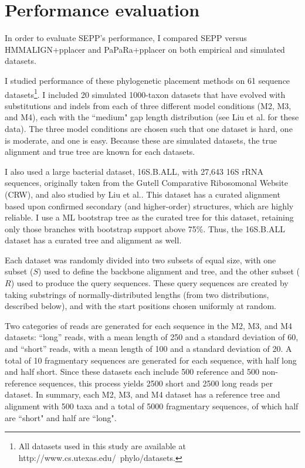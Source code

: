 \section{Performance evaluation}\label{sepp:evaluation}

In order to evaluate SEPP's performance, I compared SEPP 
versus HMMALIGN+pplacer and PaPaRa+pplacer on both 
empirical and simulated datasets.  

I studied performance of these phylogenetic
placement methods on 61 sequence datasets\footnote{All
datasets used in this study are available at 
http://www.cs.utexas.edu/~phylo/datasets.}.
I included 20 simulated 1000-taxon datasets 
that have evolved with substitutions and indels 
from each of three different model
conditions (M2, M3, and M4),
each with the ``medium" gap length distribution
(see Liu et al.\cite{Liu2009} for these data). 
The three model conditions are chosen such
that one dataset is hard, one is moderate, and one is easy.
Because these are simulated datasets,
the true alignment and true tree are known for each datasets. 

I also used
a large bacterial dataset, 16S.B.ALL, with 27,643 16S rRNA sequences, 
originally taken from the Gutell Comparative
Ribosomonal Website (CRW)\cite{Cannone2002}, and also studied by
Liu et al.\cite{Liu2011}.
This dataset has
a curated alignment based upon confirmed secondary (and higher-order)
structures, which are highly reliable.
I use a ML bootstrap tree as the curated
tree for this dataset, retaining only those branches with bootstrap
support above 75\%\cite{Liu2011}. 
Thus, the 16S.B.ALL dataset has a curated tree and alignment as well.

Each dataset was randomly divided into two subsets of equal size,
with one subset ($S$) used to define the backbone alignment and tree,
and the other subset ($R$) used to produce the query sequences.
These query sequences are created by taking substrings of 
normally-distributed lengths (from two distributions, described below), and
with the start positions chosen uniformly at random.

Two categories of reads are generated for each sequence in the M2, M3, and M4
datasets:
``long'' reads, with a mean length of 250 and a standard deviation of 60, 
and ``short'' reads, with a mean length of 100 and a standard deviation of 20.
A total of 10 fragmentary sequences are generated for each sequence,
with half long and half short.  Since
these datasets each include 500 reference and 500 non-reference sequences, 
this process yields 2500 short  and 2500 long reads per dataset.
In summary, each M2, M3, and M4 dataset has a reference tree and alignment 
with 500 taxa and a total of 5000 fragmentary sequences, of which half are
``short" and half are ``long".

